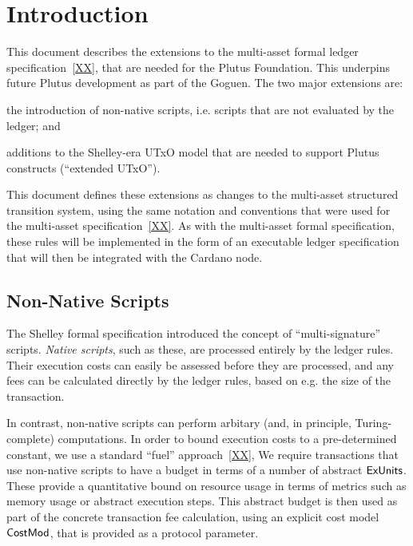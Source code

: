 \section{Introduction}

This document describes the extensions to the multi-asset formal ledger specification~\ref{XX},
that are needed for the Plutus Foundation.  This underpins future Plutus development as part of the Goguen.
%
The two major extensions are:
\begin{inparaenum}
\item
the introduction
of non-native scripts, i.e. scripts that are not evaluated by the ledger; and
\item
  additions to the Shelley-era UTxO model that are needed to support Plutus
  constructs (``extended UTxO'').
\end{inparaenum}
This document defines these extensions as changes to the multi-asset structured transition system,
using the same notation and conventions that were used for the multi-asset specification~\ref{XX}.
As with the multi-asset formal specification, these rules will be implemented in the form of an executable ledger specification that will then be
integrated with the Cardano node.

\subsection{Non-Native Scripts}

The Shelley formal specification introduced the concept of ``multi-signature'' scripts.
\emph{Native scripts}, such as these, are processed entirely by the ledger rules.
Their execution costs can easily be assessed before they are processed,
and any fees can be calculated directly by the ledger rules, based on e.g. the
size of the transaction.

In contrast, non-native scripts can perform arbitary
(and, in principle, Turing-complete) computations.
In order to bound execution costs to a pre-determined constant, we use a standard ``fuel'' approach~\ref{XX},
We require transactions that use non-native scripts
to have a budget in terms of a number of abstract $\mathsf{ExUnits}$.
These provide a quantitative bound on resource usage in terms of metrics such as memory usage or abstract execution steps.
This abstract budget is then used as part of the concrete transaction fee calculation, using an explicit
cost model $\mathsf{CostMod}$, that is provided as a protocol parameter.


